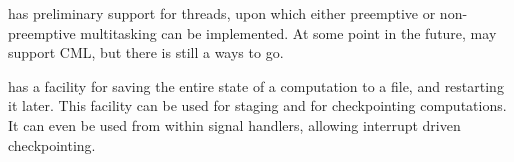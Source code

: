 \begin{description}
\begin{description}
{\mlton} has preliminary support for threads, upon which either
preemptive or non-preemptive multitasking can be implemented.  At some
point in the future, {\mlton} may support CML, but there is still a
ways to go.

{\mlton} has a facility for saving the entire state of a computation
to a file, and restarting it later.  This facility can be used for
staging and for checkpointing computations.  It can even be used from
within signal handlers, allowing interrupt driven checkpointing.

\end{description}
\end{description}

